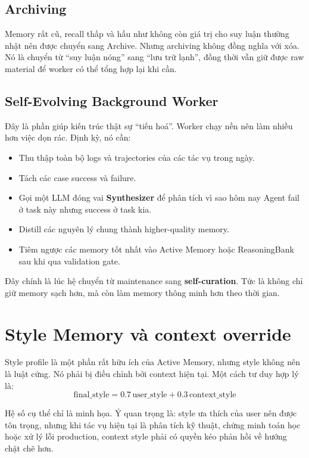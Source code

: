 \documentclass[a4paper,12pt]{article}
\begin{document}
\subsection*{Archiving}

Memory rất cũ, recall thấp và hầu như không còn giá trị cho suy luận thường nhật nên được chuyển sang Archive. Nhưng archiving không đồng nghĩa với xóa. Nó là chuyển từ ``suy luận nóng'' sang ``lưu trữ lạnh'', đồng thời vẫn giữ được raw material để worker có thể tổng hợp lại khi cần.

\subsection*{Self-Evolving Background Worker}

Đây là phần giúp kiến trúc thật sự ``tiến hoá''. Worker chạy nền nên làm nhiều hơn việc dọn rác. Định kỳ, nó cần:
\begin{itemize}
    \item Thu thập toàn bộ logs và trajectories của các tác vụ trong ngày.
    \item Tách các case success và failure.
    \item Gọi một LLM đóng vai \textbf{Synthesizer} để phân tích vì sao hôm nay Agent fail ở task này nhưng success ở task kia.
    \item Distill các nguyên lý chung thành higher-quality memory.
    \item Tiêm ngược các memory tốt nhất vào Active Memory hoặc ReasoningBank sau khi qua validation gate.
\end{itemize}

Đây chính là lúc hệ chuyển từ maintenance sang \textbf{self-curation}. Tức là không chỉ giữ memory sạch hơn, mà còn làm memory thông minh hơn theo thời gian.

\section{Style Memory và context override}

Style profile là một phần rất hữu ích của Active Memory, nhưng style không nên là luật cứng. Nó phải bị điều chỉnh bởi context hiện tại. Một cách tư duy hợp lý là:
\[
\text{final\_style} = 0.7\,\text{user\_style} + 0.3\,\text{context\_style}
\]

Hệ số cụ thể chỉ là minh họa. Ý quan trọng là: style ưa thích của user nên được tôn trọng, nhưng khi tác vụ hiện tại là phân tích kỹ thuật, chứng minh toán học hoặc xử lý lỗi production, context style phải có quyền kéo phản hồi về hướng chặt chẽ hơn.
\end{document}
